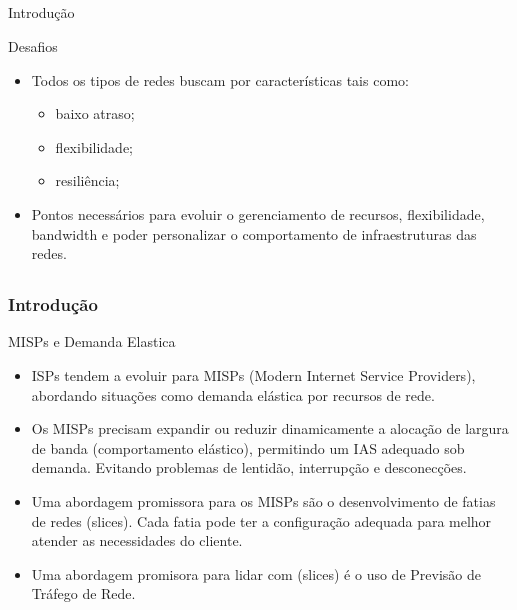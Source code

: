 \documentclass[aspectratio=169]{beamer}
\begin{document}
\subsection{}
\begin{frame}{Introdução}
    \begin{block}{Desafios}
\begin{itemize}
    \item Todos os tipos de redes buscam por características tais como:
    \begin{itemize}[triangle]
        \item baixo atraso;
        \item flexibilidade;
        \item resiliência;
    \end{itemize}
    \item Pontos necessários para evoluir o gerenciamento de recursos, flexibilidade, bandwidth e poder personalizar o comportamento de infraestruturas das redes.
\end{itemize}
\end{block}
\end{frame}

\subsection{}
\begin{frame}
\frametitle{Introdução}
\begin{block}{MISPs e Demanda Elastica}
    \begin{itemize}
    \item ISPs tendem a evoluir para MISPs (Modern Internet Service Providers), abordando situações como demanda elástica por recursos de rede. 
    \item Os MISPs precisam expandir ou reduzir dinamicamente a alocação de largura de banda (comportamento elástico), permitindo um IAS adequado sob demanda. Evitando problemas de lentidão, interrupção e desconecções. 
    \item Uma abordagem promissora para os MISPs são o desenvolvimento de fatias de redes (slices). Cada fatia pode ter a configuração adequada para melhor atender as necessidades do cliente.
    \item Uma abordagem promisora para lidar com (slices) é o uso de Previsão de Tráfego de Rede.
    \end{itemize}
\end{block}
\end{frame}
\end{document}
